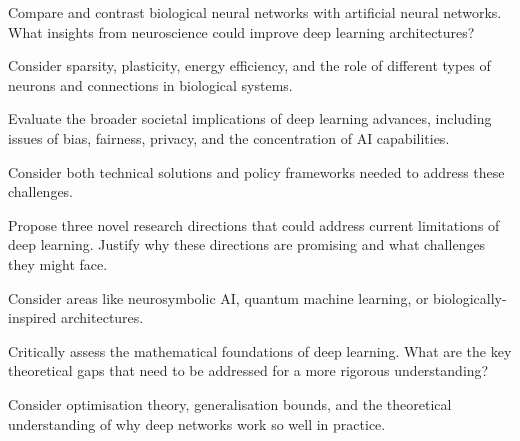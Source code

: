 \begin{exercisebox}[hard]
\begin{problem}
Compare and contrast biological neural networks with artificial neural networks. What insights from neuroscience could improve deep learning architectures?
\end{problem}
\begin{hintbox}
Consider sparsity, plasticity, energy efficiency, and the role of different types of neurons and connections in biological systems.
\end{hintbox}
\end{exercisebox}


\begin{exercisebox}[hard]
\begin{problem}
Evaluate the broader societal implications of deep learning advances, including issues of bias, fairness, privacy, and the concentration of AI capabilities.
\end{problem}
\begin{hintbox}
Consider both technical solutions and policy frameworks needed to address these challenges.
\end{hintbox}
\end{exercisebox}


\begin{exercisebox}[hard]
\begin{problem}
Propose three novel research directions that could address current limitations of deep learning. Justify why these directions are promising and what challenges they might face.
\end{problem}
\begin{hintbox}
Consider areas like neurosymbolic AI, quantum machine learning, or biologically-inspired architectures.
\end{hintbox}
\end{exercisebox}


\begin{exercisebox}[hard]
\begin{problem}
Critically assess the mathematical foundations of deep learning. What are the key theoretical gaps that need to be addressed for a more rigorous understanding?
\end{problem}
\begin{hintbox}
Consider optimisation theory, generalisation bounds, and the theoretical understanding of why deep networks work so well in practice.
\end{hintbox}
\end{exercisebox}


